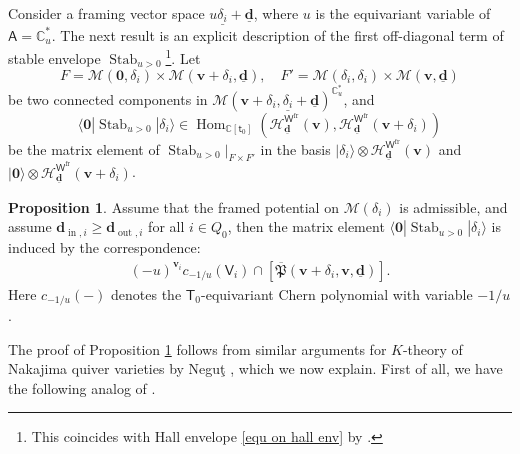 \documentclass[10pt]{amsart}
\theoremstyle{definition}
\newtheorem{Proposition}[Theorem]{Proposition}
\numberwithin{equation}{section}
\newcommand{\bC}{\mathbb{C}}
\newcommand{\bv}{\mathbf{v}}
\newcommand{\bd}{\mathbf{d}}
\newcommand{\cH}{\mathcal{H}}
\newcommand{\cM}{\mathcal{M}}
\newcommand{\sA}{\mathsf{A}}
\newcommand{\sT}{\mathsf{T}}
\newcommand{\sW}{\mathsf{W}}
\newcommand{\Hom}{\operatorname{Hom}}
\newcommand{\Stab}{\operatorname{Stab}}
\newcommand{\In}{\operatorname{in}}
\newcommand{\Out}{\operatorname{out}}
\begin{document}
Consider a framing vector space $u\underline{\delta_i}+\underline{\bd}$, where $u$ is the equivariant variable of $\sA=\bC^*_u$. The next result is an explicit description of the first off-diagonal term of stable envelope $\Stab_{u>0}$\footnote{This coincides with Hall envelope \eqref{equ on hall env} by \cite[Prop.~9.23]{COZZ}.}. Let \begin{equation}
\label{equ onFF'}
F=\cM(\mathbf{0},\delta_i)\times \cM(\bv+\delta_i,\underline{\bd}),\quad F'=\cM(\delta_i,\delta_i)\times\cM(\bv,\underline{\bd})
\end{equation}be two connected components in $\cM(\bv+\delta_i,\underline{\delta_i}+\underline{\bd})^{\bC^*_u}$, and $$\langle \mathbf 0|\Stab_{u>0}|\delta_i\rangle\in \Hom_{\bC[\mathsf t_0]}\left(\cH^{\sW^{\mathrm{fr}}}_{\underline{\bd}}(\bv),\cH^{\sW^{\mathrm{fr}}}_{\underline{\bd}}(\bv+\delta_i)\right)$$ be the matrix element of $\Stab_{u>0}\big|_{F\times F'}$ in the basis $|\delta_i\rangle\otimes \cH^{\sW^{\mathrm{fr}}}_{\underline{\bd}}(\bv)$ and $|\mathbf 0\rangle\otimes \cH^{\sW^{\mathrm{fr}}}_{\underline{\bd}}(\bv+\delta_i)$.

\begin{Proposition}
\label{prop e as stab element}
Assume that the framed potential on $\cM(\delta_i)$ is admissible, and assume $\bd_{\In, i}\geqslant \bd_{\Out, i}$ for all $i\in Q_0$, then the matrix element $\langle \mathbf 0|\Stab_{u>0}|\delta_i\rangle$ is induced by the correspondence:
\begin{align*}
   (-u)^{\bv_i} c_{-1/u}(\mathsf V_i)\cap[\overline{\mathfrak{P}}(\bv+\delta_i,\bv,\underline{\bd})].
\end{align*}
Here $c_{-1/u}(-)$ denotes the $\sT_0$-equivariant Chern polynomial with variable $-1/u$.
\end{Proposition}

The proof of Proposition \ref{prop e as stab element} follows from similar arguments for $K$-theory of Nakajima quiver varieties by Negu\c{t} \cite[Prop.~3.16]{N2}, which we now explain. 
First of all, we have the following analog of \cite[Prop.~2.19]{N2}.
\end{document}
